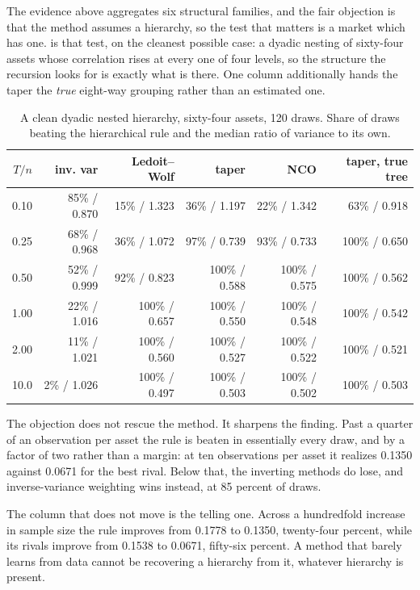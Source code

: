 \documentclass[11pt]{article}
\begin{document}
The evidence above aggregates six structural families, and the fair objection
is that the method assumes a hierarchy, so the test that matters is a market
which has one.  is that test, on the cleanest possible case:
a dyadic nesting of sixty-four assets whose correlation rises at every one of
four levels, so the structure the recursion looks for is exactly what is
there. One column additionally hands the taper the \emph{true} eight-way
grouping rather than an estimated one.

\begin{table}[ht]
\centering
\footnotesize
\begin{tabular}{rrrrrr}
\toprule
$T/n$ & inv. var & Ledoit--Wolf & taper & NCO & taper, true tree \\
\midrule
0.10 & 85\% / 0.870 & 15\% / 1.323 & 36\% / 1.197 & 22\% / 1.342 & 63\% / 0.918 \\
0.25 & 68\% / 0.968 & 36\% / 1.072 & 97\% / 0.739 & 93\% / 0.733 & 100\% / 0.650 \\
0.50 & 52\% / 0.999 & 92\% / 0.823 & 100\% / 0.588 & 100\% / 0.575 & 100\% / 0.562 \\
1.00 & 22\% / 1.016 & 100\% / 0.657 & 100\% / 0.550 & 100\% / 0.548 & 100\% / 0.542 \\
2.00 & 11\% / 1.021 & 100\% / 0.560 & 100\% / 0.527 & 100\% / 0.522 & 100\% / 0.521 \\
10.0 & \phantom{0}2\% / 1.026 & 100\% / 0.497 & 100\% / 0.503 & 100\% / 0.502 & 100\% / 0.503 \\
\bottomrule
\end{tabular}
\caption{A clean dyadic nested hierarchy, sixty-four assets, 120 draws. Share
of draws beating the hierarchical rule and the median ratio of variance to
its own.}
\label{tab:nested}
\end{table}

The objection does not rescue the method. It sharpens the finding. Past a
quarter of an observation per asset the rule is beaten in essentially every
draw, and by a factor of two rather than a margin: at ten observations per
asset it realizes 0.1350 against 0.0671 for the best rival. Below that, the
inverting methods do lose, and inverse-variance weighting wins instead, at 85
percent of draws.

The column that does not move is the telling one. Across a hundredfold
increase in sample size the rule improves from 0.1778 to 0.1350, twenty-four
percent, while its rivals improve from 0.1538 to 0.0671, fifty-six percent. A
method that barely learns from data cannot be recovering a hierarchy from it,
whatever hierarchy is present.
\end{document}
